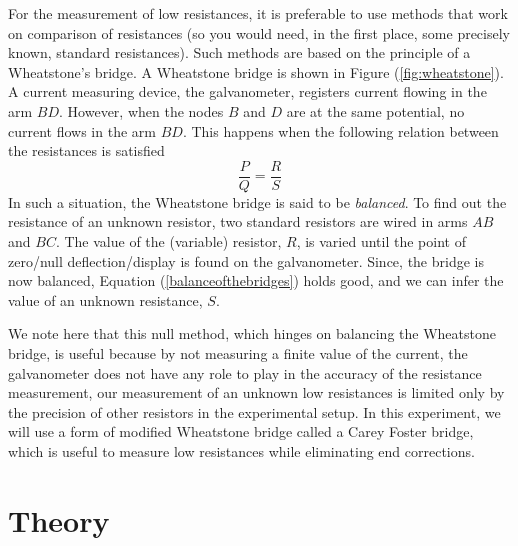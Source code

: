 For the measurement of low resistances, it is preferable to use methods that work on comparison of resistances (so you would need, in the first place, some precisely known, standard resistances). Such methods are based on the principle of a Wheatstone's bridge. A Wheatstone bridge is shown in Figure (\ref{fig:wheatstone}). A current measuring device, the galvanometer, registers current flowing in the arm $BD$. However, when the nodes $B$ and $D$ are at the same potential, no current flows in the arm $BD$. This happens when the following relation between the resistances is satisfied
\begin{equation}
    \frac{P}{Q}  =\frac{R}{S}
    \label{balanceofthebridges}
\end{equation}
In such a situation, the Wheatstone bridge is said to be \textit{balanced}.
To find out the resistance of an unknown resistor, two standard resistors are wired in arms $AB$ and $BC$. The value of the (variable) resistor, $R$, is varied until the point of zero/null deflection/display is found on the galvanometer. Since, the bridge is now balanced, Equation (\ref{balanceofthebridges}) holds good, and we can infer the value of an unknown resistance, $S$. 

We note here that this null method, which hinges on balancing the Wheatstone bridge, is useful because by not measuring a finite value of the current, the galvanometer does not have any role to play in the accuracy of the resistance measurement, our measurement of an unknown low resistances is limited only by the precision of other resistors in the experimental setup. In this experiment, we will use a form of modified Wheatstone bridge called a Carey Foster bridge, which is useful to measure low resistances while eliminating end corrections.





\section*{Theory}

